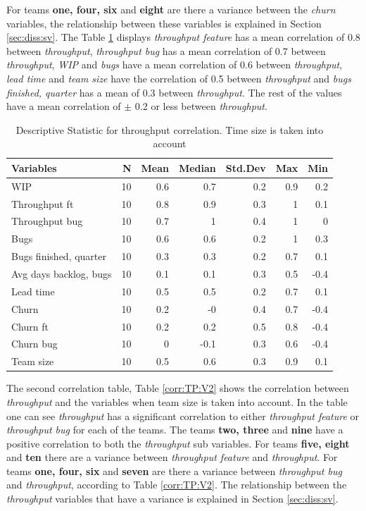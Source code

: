 \documentclass[UKenglish]{ifimaster}  %
\begin{document}
For teams \textbf{one, four, six} and \textbf{eight} are there a variance between the \textit{churn} variables, the relationship between these variables is explained in Section \ref{sec:diss:sv}.
The Table \ref{DS:corr:TP} displays \textit{throughput feature} has a mean correlation of 0.8 between \textit{throughput}, \textit{throughput bug} has a mean correlation  of 0.7 between \textit{throughput}, \textit{WIP} and \textit{bugs} have a mean correlation of 0.6 between \textit{throughput}, \textit{lead time} and \textit{team size} have the correlation of 0.5 between \textit{throughput} and \textit{bugs finished, quarter} has a mean of 0.3 between \textit{throughput}. The rest of the values have a mean correlation of $\pm$ 0.2 or less between \textit{throughput}.
\begin{table}[!htbp]
 \caption{Descriptive Statistic for throughput correlation.  Time size is taken into account}
 \centering
 \begin{tabular}{ | l | r | r | r | r | r | r | }
 \hline
\textbf{Variables}& \bf{N} & \bf{Mean} & \bf{Median} & \bf{Std.Dev} & \bf{Max} & \bf{Min} \\ \hline
WIP  & 10 & 0.6 & 0.7 & 0.2 & 0.9 & 0.2\\ \hline
Throughput ft  & 10 & 0.8 & 0.9 & 0.3 & 1 & 0.1\\ \hline
Throughput bug  & 10 & 0.7 & 1 & 0.4 & 1 & 0\\ \hline
Bugs  & 10 & 0.6 & 0.6 & 0.2 & 1 & 0.3\\ \hline
Bugs finished, quarter  & 10 & 0.3 & 0.3 & 0.2 & 0.7 & 0.1\\ \hline
Avg days backlog, bugs  & 10 & 0.1 & 0.1 & 0.3 & 0.5 & -0.4\\ \hline
Lead time & 10 & 0.5 & 0.5 & 0.2 & 0.7 & 0.1\\ \hline
Churn  & 10 & 0.2 & -0 & 0.4 & 0.7 & -0.4\\ \hline
Churn ft  & 10 & 0.2 & 0.2 & 0.5 & 0.8 & -0.4\\ \hline
Churn bug  & 10 & 0 & -0.1 & 0.3 & 0.6 & -0.4\\ \hline
Team size  & 10 & 0.5 & 0.6 & 0.3 & 0.9 & 0.1\\ \hline
\end{tabular}
 \label{DS:corr:TP}
 \end{table}
 \newpage
 
The second correlation table, Table \ref{corr:TP:V2} shows the correlation between \textit{throughput} and the variables when team size is taken into account. In the table one can see \textit{throughput} has a significant correlation to either \textit{throughput feature} or \textit{throughput bug} for each of the teams. The teams \textbf{two, three} and \textbf{nine} have a positive correlation to both the \textit{throughput} sub variables. For teams \textbf{five, eight} and \textbf{ten} there are a variance between \textit{throughput feature} and \textit{throughput}.  For teams \textbf{one, four, six} and \textbf{seven} are there a variance between \textit{throughput bug} and \textit{throughput}, according to Table \ref{corr:TP:V2}. The relationship between the \textit{throughput} variables that have a variance is explained in Section \ref{sec:diss:sv}.
\end{document}
